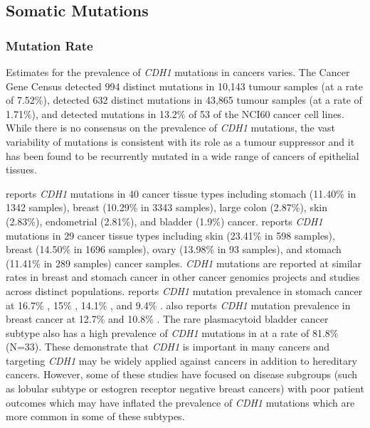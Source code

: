 \iffalse
\subsection{Somatic Mutations}
\subsubsection{Mutation Rate}

Estimates for the prevalence of \textit{CDH1}  \glspl{mutation}  in  cancers varies. The Cancer Gene Census \citep{Futreal2004, Pleasance2010} detected 994 distinct \glspl{mutation} in 10,143 tumour samples (at a rate of 7.52\%), \citet{COSMICdb} detected 632 distinct \glspl{mutation} in 43,865 tumour samples (at a rate of 1.71\%), and detected \glspl{mutation} in 13.2\% of 53 of the NCI60 cancer cell lines. While there is no consensus on the prevalence of \textit{CDH1} \glspl{mutation}, the vast variability of \glspl{mutation} is consistent with its role as a \gls{tumour suppressor} and it has been found to be recurrently mutated in a wide range of cancers of epithelial tissues.

\citet{COSMICdb} reports \textit{CDH1} \glspl{mutation} in 40 cancer tissue types including stomach (11.40\% in 1342 samples), breast (10.29\% in 3343 samples), large colon (2.87\%), skin (2.83\%), endometrial (2.81\%), and bladder (1.9\%) cancer. \citet{ICGC2017web} reports \textit{CDH1} \glspl{mutation} in 29 cancer tissue types including skin (23.41\% in 598 samples), breast (14.50\% in 1696 samples), ovary (13.98\% in 93 samples), and stomach (11.41\% in 289 samples) cancer samples. \textit{CDH1} \glspl{mutation} are reported at similar rates in breast and stomach cancer in other cancer \glspl{genomic} projects and studies across distinct populations. \citet{cBioPortal} reports \textit{CDH1} \gls{mutation} prevalence in stomach cancer at 16.7\% \citep[30 samples]{Kakiuchi2014}, 15\% \citep[100 samples]{Wang2014}, 14.1\% \citep[78 samples]{Chen2015}, and 9.4\% \citep[393 samples]{TCGA2017prov}. \citet{cBioPortal} also reports \textit{CDH1} \gls{mutation} prevalence in breast cancer at 12.7\% \citep[963 samples]{TCGA2017prov} and 10.8\% \citep[2051 samples]{METABRIC2012, METABRIC2016}. The rare plasmacytoid bladder cancer subtype also has a high prevalence of \textit{CDH1} \glspl{mutation} in \citet{COSMICdb} at a rate of 81.8\% (N=33). These demonstrate that \textit{CDH1} is important in many cancers and targeting \textit{CDH1} may be widely applied against  cancers in addition to \gls{hereditary} cancers. However, some of these studies have focused on disease subgroups (such as lobular subtype or estogren receptor negative breast cancers) with poor patient outcomes which may have inflated the prevalence of \textit{CDH1} \glspl{mutation} which are more common in some of these subtypes.

